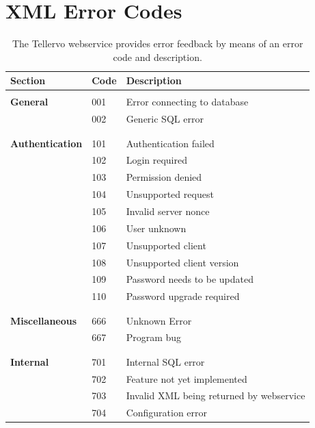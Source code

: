 \chapter{XML Error Codes}
\label{txt:errorcodes}
\begin{longtable}{lll}
  \caption{The Tellervo webservice provides error feedback by means of an error code and description.}\\
  \toprule
  \textbf{Section} & \textbf{Code} & \textbf{Description} \\
  \endhead
  \midrule
  & & \\

  \textbf{General}
  & 001 & Error connecting to database \\
  & 002 & Generic SQL error \\
  
  & & \\
  \midrule
  & & \\
  
  \textbf{Authentication}
  & 101 & Authentication failed \\
  & 102 & Login required \\
  & 103 & Permission denied \\
  & 104 & Unsupported request \\
  & 105 & Invalid server nonce \\
  & 106 & User unknown \\
  & 107 & Unsupported client \\
  & 108 & Unsupported client version \\
  & 109 & Password needs to be updated \\
  & 110 & Password upgrade required \\

  & & \\
  \midrule
  & & \\

  \textbf{Miscellaneous} 
  & 666 & Unknown Error \\
  & 667 & Program bug \\

  & & \\
  \midrule
  & & \\

  \textbf{Internal} 
  & 701 & Internal SQL error \\
  & 702 & Feature not yet implemented \\
  & 703 & Invalid XML being returned by webservice \\
  & 704 & Configuration error \\


\end{longtable}
